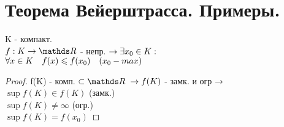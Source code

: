 \documentclass[geometry.tex]{subfiles}
\begin{document}
  \section{Теорема Вейерштрасса. Примеры.}

  \begin{theorem} [Вейерштрасса]
      K - компакт.\\
      $f: K \rightarrow \R $ - непр. $\rightarrow \exists x_0 \in K:$\\
      $\forall x \in K \quad f(x) \leqslant f(x_0) \quad (x_0 - max)$
  \end{theorem}

  \begin{proof}
      f(K) - комп. $\subset \R \; \ra f(K)$ - замк. и огр $\rightarrow$\\
      $\sup{f(K)} \in f(K)$ (замк.)\\
      $\sup{f(K)} \neq \infty$ (огр.)\\
      $\sup{f(K)} = f(x_0)$
  \end{proof}
\end{document}
